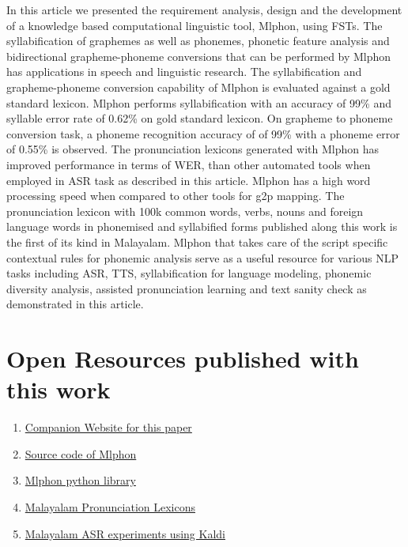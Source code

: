 \documentclass{ieeeaccess}
\begin{document}
In this article we presented the requirement analysis, design and the development of a knowledge based computational linguistic tool, Mlphon, using FSTs. The syllabification of graphemes as well as phonemes, phonetic feature analysis and bidirectional grapheme-phoneme conversions that can be performed by Mlphon has applications in speech and linguistic research. The syllabification and grapheme-phoneme conversion capability of Mlphon is evaluated against a gold standard lexicon. Mlphon performs syllabification with an  accuracy of 99\% and syllable error rate of 0.62\% on gold standard lexicon. On grapheme to phoneme conversion task, a phoneme recognition accuracy of of 99\%  with a phoneme error of  0.55\% is observed. The pronunciation lexicons generated with Mlphon has improved performance in terms of WER, than other automated tools when employed in ASR task as described in this article. Mlphon has a high word processing speed when compared to other tools for g2p mapping. The pronunciation lexicon with 100k common words, verbs, nouns and foreign language words in phonemised and syllabified forms published along this work is the first of its kind in Malayalam.  Mlphon that takes care of the script specific contextual rules for phonemic analysis serve as a useful resource for various NLP tasks including ASR, TTS, syllabification for language modeling, phonemic diversity analysis, assisted pronunciation learning and text sanity check as demonstrated in this article.
\appendices


\section{Open Resources published with this work}
\label{resources}
\begin{enumerate}
    \item \href{https://phon.smc.org.in/}{Companion Website for this paper} 
	\item \href{https://github.com/kavyamanohar/mlphon}{Source code of Mlphon}
	\item \href{https://pypi.org/project/mlphon/}{Mlphon python library}
	\item \href{https://gitlab.com/kavyamanohar/malayalam-phonetic-lexicon}{Malayalam Pronunciation Lexicons}
	\item \href{https://gitlab.com/kavyamanohar/asr-malayalam}{Malayalam ASR experiments using Kaldi}
\end{enumerate}


\end{document}
